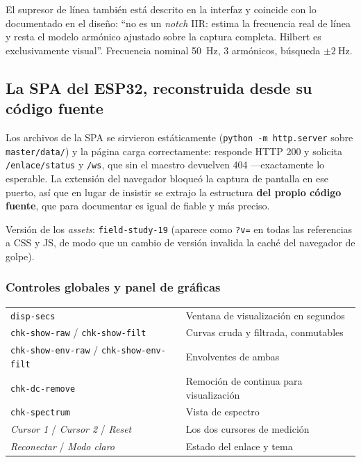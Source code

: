El supresor de l\'inea tambi\'en est\'a descrito en la interfaz y coincide con lo
documentado en el dise\~no: ``no es un \emph{notch} IIR: estima la frecuencia
real de l\'inea y resta el modelo arm\'onico ajustado sobre la captura completa.
Hilbert es exclusivamente visual''. Frecuencia nominal \SI{50}{\hertz},
3 arm\'onicos, b\'usqueda $\pm\SI{2}{\hertz}$.

\subsection{La SPA del ESP32, reconstruida desde su c\'odigo fuente}
\label{sec:spa-esp-detalle}

Los archivos de la SPA se sirvieron est\'aticamente
(\texttt{python -m http.server} sobre \texttt{master/data/}) y la p\'agina carga
correctamente: responde HTTP 200 y solicita \texttt{/enlace/status} y
\texttt{/ws}, que sin el maestro devuelven 404 ---exactamente lo esperable. La
extensi\'on del navegador bloque\'o la captura de pantalla en ese puerto, as\'i
que en lugar de insistir se extrajo la estructura \textbf{del propio c\'odigo
fuente}, que para documentar es igual de fiable y m\'as preciso.

Versi\'on de los \emph{assets}: \texttt{field-study-19} (aparece como
\texttt{?v=} en todas las referencias a CSS y JS, de modo que un cambio de
versi\'on invalida la cach\'e del navegador de golpe).

\subsubsection{Controles globales y panel de gr\'aficas}

\begin{center}\footnotesize
\begin{tabularx}{\textwidth}{@{}l X@{}}
\toprule
\texttt{disp-secs} & Ventana de visualizaci\'on en segundos \\
\texttt{chk-show-raw} / \texttt{chk-show-filt} & Curvas cruda y filtrada, conmutables \\
\texttt{chk-show-env-raw} / \texttt{chk-show-env-filt} & Envolventes de ambas \\
\texttt{chk-dc-remove} & Remoci\'on de continua para visualizaci\'on \\
\texttt{chk-spectrum} & Vista de espectro \\
\emph{Cursor 1} / \emph{Cursor 2} / \emph{Reset} & Los dos cursores de medici\'on \\
\emph{Reconectar} / \emph{Modo claro} & Estado del enlace y tema \\
\bottomrule
\end{tabularx}
\end{center}


